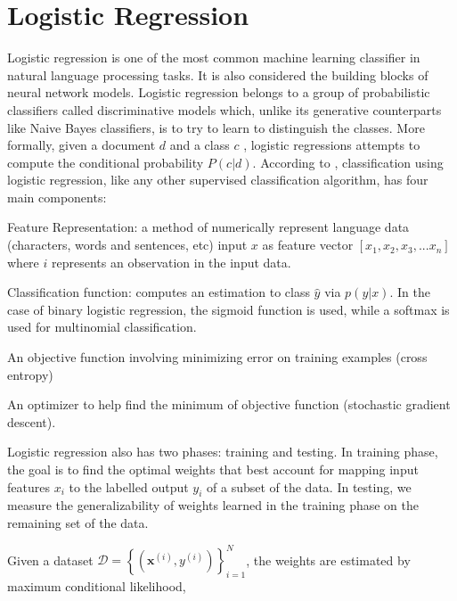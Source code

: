  \section{Logistic Regression}
 Logistic regression is one of the most common machine learning classifier in natural language processing tasks. It is also considered the building blocks of neural network models. Logistic regression belongs to a group of probabilistic classifiers called discriminative models which, unlike its generative counterparts like Naive Bayes classifiers, is to try to learn to distinguish the classes. More formally, given a document $d$ and a class $c$ , logistic regressions attempts to compute the conditional probability $P(c|d)$. 
 According to \citep{jurafsky2014speech}, classification using logistic regression, like any other supervised classification algorithm, has four main components: 

\begin{list}{•}{}
 \item Feature Representation: a method of numerically represent language data (characters, words and sentences, etc) input $x$ as feature vector $[x_{1},x_{2},x_{3},...x_{n}]$ where $i$  represents an observation in the input data.

\item Classification function: computes an estimation to class $\hat{y}$ via $p(y|x)$. In the case of binary logistic regression, the sigmoid function is used, while a softmax is used for multinomial classification. 
 
\item An objective function involving minimizing error on training examples (cross entropy)

\item An optimizer to help find the minimum of objective function 
 (stochastic gradient descent).
 \end{list}

Logistic regression also has two phases: training and testing. In training phase, the goal is to find the optimal weights that best account for mapping input features $x_{i}$ to the labelled output $y_{i}$ of a subset of the data. In testing, we measure the generalizability of weights learned in the training phase on the remaining set of the data.

Given a dataset $\mathcal { D } = \left\{ \left( \boldsymbol { x } ^ { ( i ) } , y ^ { ( i ) } \right) \right\} _ { i = 1 } ^ { N }$, the weights  are estimated by maximum conditional likelihood, 

